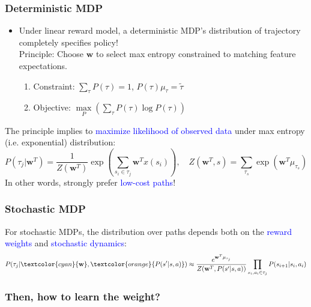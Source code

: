 \documentclass{article}
\begin{document}
\subsubsection{Deterministic MDP}
\begin{itemize}
\item Under linear reward model, a deterministic MDP's distribution of trajectory completely specifies policy!
    \\Principle: Choose $\mathbf{w}$ to select max entropy constrained to matching feature expectations.
    \begin{enumerate}
    \item Constraint: $\sum_{\tau} P(\tau) = 1$, $P(\tau) \mu_{\tau} = \tilde{\tau}$
    \item Objective: $\mathop{\max}\limits_{P} \left( \sum_{\tau} P(\tau) \log P(\tau) \right)$
    \end{enumerate}
\end{itemize}

The principle implies to \textcolor{blue}{maximize likelihood of observed data} under max entropy (i.e. exponential) distribution:
\begin{equation*}
    P(\tau_{j} | \mathbf{w}^{T}) = \frac{1}{Z(\mathbf{w}^{T})} \exp \left( \sum_{s_i \in \tau_{j}} \mathbf{w}^{T} x(s_i) \right), 
    \quad Z(\mathbf{w}^{T}, s) = \sum_{\tau_{s}} \exp \left( \mathbf{w}^{T} \mu_{\tau_{s}} \right)
\end{equation*}
In other words, strongly prefer \textcolor{blue}{low-cost paths}!

\subsubsection{Stochastic MDP}
For stochastic MDPs, the distribution over paths depends both on the \textcolor{blue}{reward weights} and \textcolor{blue}{stochastic dynamics}:
\begin{equation*}
    P(\tau_{j} | \textcolor{cyan}{\mathbf{w}}, \textcolor{orange}{P(s' | s, a)} ) \approx \frac{e^{\mathbf{w}^{T} \mu_{\tau_{j}}}}{Z(\mathbf{w}^{T}, P(s' | s, a))} \prod_{s_{i}, a_{i} \in \tau_{j}} P(s_{i+1} | s_{i}, a_{i})
\end{equation*}

\subsubsection{Then, how to learn the weight?}
\end{document}
